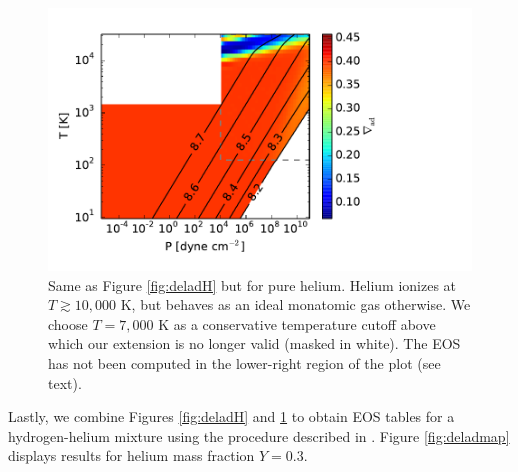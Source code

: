 \begin{figure}[h!]
\centering
\includegraphics[scale=.8]{figures/delad_S_He.pdf}
\caption{Same as Figure \ref{fig:deladH} but for pure helium. Helium ionizes at $T \gtrsim 10,000$ K, but behaves as an ideal monatomic gas otherwise. We choose $T=7,000$ K as a conservative temperature cutoff above which our  extension is no longer valid (masked in white). The EOS has not been computed in the lower-right region of the plot (see text).}
\label{fig:deladHe}
\end{figure}

\vspace{0.2in}

Lastly, we combine Figures \ref{fig:deladH} and \ref{fig:deladHe} to obtain EOS tables for a hydrogen-helium mixture using the procedure described in \citet{saumon95}.  Figure \ref{fig:deladmap} displays results for helium mass fraction $Y=0.3$.


